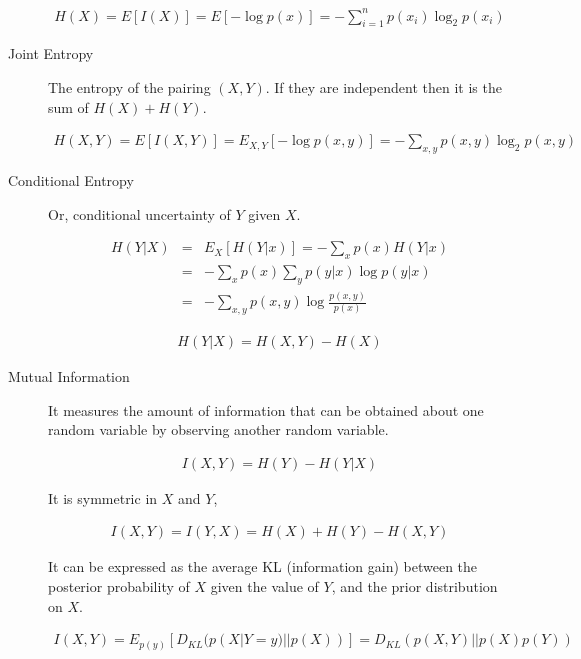 \documentclass[10pt,landscape]{article}
\begin{document}
\begin{multicols*}{3}
\begin{description}
    \begin{align*}
    H(X) = E[I(X)] = E[-\log p(x)] = -\sum_{i=1}^{n} p(x_i) \log_2 p(x_i)
    \end{align*}

    \item[Joint Entropy] The entropy of the pairing $(X,Y)$.  If  they are independent
     then it is the sum of $H(X)+H(Y)$.

     \begin{align*}
         H(X,Y) = E[I(X,Y)] = E_{X,Y}[-\log p(x,y)] = -\sum_{x,y} p(x,y) \log_2 p(x,y)
     \end{align*}

    \item[Conditional Entropy] Or, conditional uncertainty of $Y$ given $X$.

     \begin{align*}
         H(Y|X) &=& E_X[H(Y|x)] = -\sum_{x} p(x) H(Y|x) \\
                &=& -\sum_{x} p(x) \sum_{y} p(y|x) \log p(y|x) \\
                &=& -\sum_{x,y} p(x,y) \log \frac{p(x,y)}{p(x)}
     \end{align*}

     \begin{align*}
        H(Y|X) = H(X,Y) - H(X)
     \end{align*}

    \item[Mutual Information] It measures the amount of information that can be obtained about one random variable by
    observing another random variable.

     \begin{align*}
         I(X,Y) = H(Y) - H(Y|X)
     \end{align*}

     It is symmetric in $X$ and $Y$,

     \begin{align*}
        I(X,Y) = I(Y,X) = H(X) + H(Y) - H(X,Y)
     \end{align*}

     It can be expressed as the average KL (information gain) between the posterior probability of $X$ given the
     value of $Y$, and the prior distribution on $X$.

     \begin{align*}
             I(X,Y) = E_{p(y)}[D_{KL}(p(X|Y=y)||p(X))] = D_{KL}(p(X,Y)||p(X)p(Y))
     \end{align*}



\end{description}
\end{multicols*}
\end{document}
